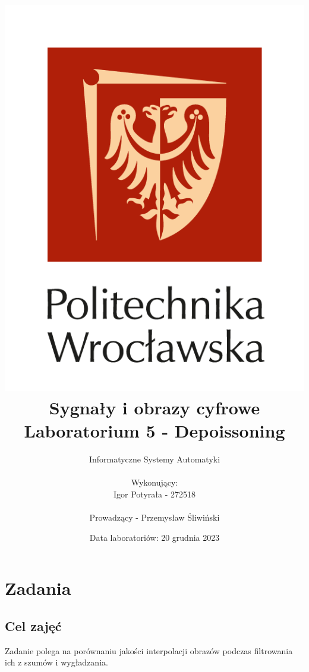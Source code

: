 \documentclass[14pt]{article}
\title{
    \includegraphics[scale=0.5]{images/logo-pwr-pion.png}
    \vspace{1cm}
    \\
    {\textbf{
    \titlefont Sygnały i obrazy cyfrowe
    \\ Laboratorium 5 - Depoissoning
    }}
}
\author{
    Informatyczne Systemy Automatyki
    \\
    \\ Wykonujący:
    \\ Igor Potyrała - 272518
    \\
    \\ Prowadzący - Przemysław Śliwiński
}
\date{Data laboratoriów: 20 grudnia 2023}
\begin{document}
\maketitle
\newpage

\section{Zadania}
\subsection{Cel zajęć}
Zadanie polega na porównaniu jakości 
interpolacji obrazów podczas 
filtrowania ich z szumów i wygładzania.
\end{document}
